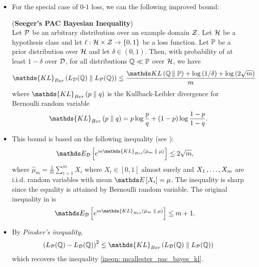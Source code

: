 \documentclass[11pt]{article}
\begin{document}
\begin{itemize}
\item For the special case of $0$-$1$ loss, we can the following improved bound:
\begin{theorem}(\textbf{Seeger's PAC Bayesian Inequality})\citep{seeger2002pac, maurer2004note, rasmussen2006gaussian, alquier2021user}\\
Let ${\mathcal P}$ be an arbitrary distribution over an example domain ${\mathcal Z}$. Let ${\mathcal H}$ be a hypothesis class and let $\ell: {\mathcal H} \times {\mathcal Z} \to \left\{0,1\right\}$ be a loss function. Let ${\mathbb P}$ be a prior distribution over ${\mathcal H}$ and let $\delta \in (0,1)$. Then, with probability of at least $1 - \delta$ over ${\mathcal D}$, for all distributions ${\mathbb Q} \ll {\mathbb P}$ over ${\mathcal H}$, we have
\begin{align}
\mathds{KL}_{Ber}\paren{L_{\cD}(\bQ) \;\|\; L_{\cP}(\bQ)} \le   \frac{\kl{\bQ}{\bP} + \log\paren{1/\delta} + \log\paren{2\sqrt{m}}}{m} \label{ineqn: seeger_pac_bayes_kl}
\end{align} where $\mathds{KL}_{Ber}\paren{p \;\|\; q}$ is  the Kullback-Leibler divergence for Bernoulli random variable
\begin{align*}
\mathds{KL}_{Ber}\paren{p \;\|\; q} = p \log\frac{p}{q} + (1-p)\log\frac{1-p}{1- q}.
\end{align*}
\end{theorem}

\item \begin{remark}
This bound is based on the following inequality (see \citep{maurer2004note}):
\begin{align}
\E{\cD}{e^{m\mathds{KL}_{Ber}\paren{\hat{\mu}_m \;\|\; \mu} }} &\le 2\sqrt{m}, \label{pf: seeger_pac_bayes_kl_1}
\end{align} where $\hat{\mu}_m = \frac{1}{m}\sum_{i=1}^{m}X_i$ where $X_i \in  [0,1]$ almost surely and $X_1 \,{,}\ldots{,}\, X_m$ are i.i.d. random variables with mean $\E{}{X_i} = \mu$. The inequality is sharp since the equality is attained by Bernoulli random variable. The original inequality in \citep{seeger2002pac} is 
\begin{align*}
\E{\cD}{e^{m\mathds{KL}_{Ber}\paren{\hat{\mu}_m \;\|\; \mu} }} &\le m + 1.
\end{align*}
\end{remark}

\item \begin{remark}
By \emph{Pinsker's inequality},
\begin{align*}
\paren{L_{\cP}(\bQ) - L_{\cD}(\bQ) }^2  \le  \mathds{KL}_{Ber}\paren{L_{\cD}(\bQ) \;\|\; L_{\cP}(\bQ)} 
\end{align*} which recovers the inequality \eqref{ineqn: mcallester_pac_bayes_kl}.
\end{remark}


\end{itemize}
\end{document}
